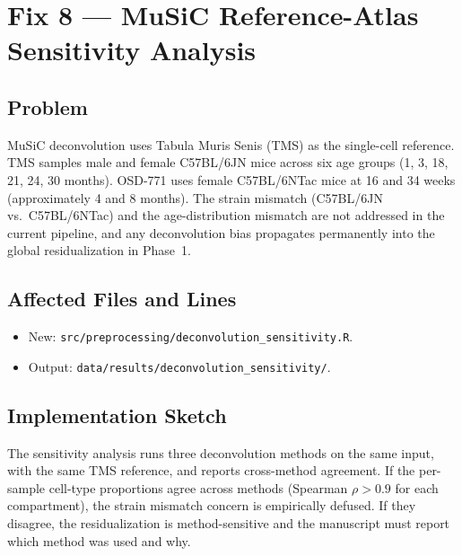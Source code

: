 \documentclass[11pt]{article}
\newcommand{\code}[1]{\texttt{#1}}
\begin{document}
\section{Fix 8 --- MuSiC Reference-Atlas Sensitivity Analysis}

\subsection{Problem}

MuSiC deconvolution uses Tabula Muris Senis (TMS) as the single-cell reference. TMS samples male and female C57BL/6JN mice across six age groups (1, 3, 18, 21, 24, 30 months). OSD-771 uses female C57BL/6NTac mice at 16 and 34 weeks (approximately 4 and 8 months). The strain mismatch (C57BL/6JN vs.\ C57BL/6NTac) and the age-distribution mismatch are not addressed in the current pipeline, and any deconvolution bias propagates permanently into the global residualization in Phase~1.

\subsection{Affected Files and Lines}

\begin{itemize}[leftmargin=*]
\item New: \code{src/preprocessing/deconvolution\_sensitivity.R}.
\item Output: \code{data/results/deconvolution\_sensitivity/}.
\end{itemize}

\subsection{Implementation Sketch}

The sensitivity analysis runs three deconvolution methods on the same input, with the same TMS reference, and reports cross-method agreement. If the per-sample cell-type proportions agree across methods (Spearman $\rho > 0.9$ for each compartment), the strain mismatch concern is empirically defused. If they disagree, the residualization is method-sensitive and the manuscript must report which method was used and why.
\end{document}
